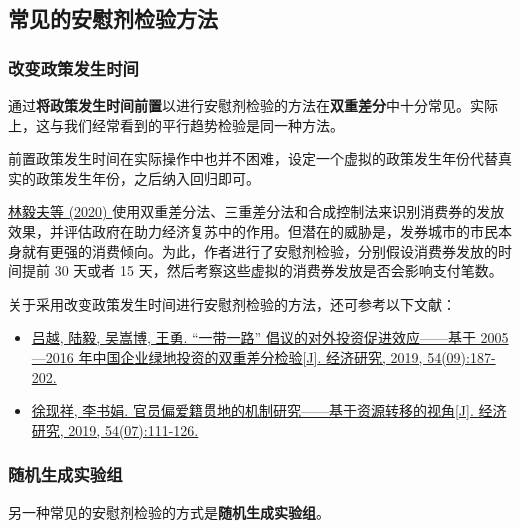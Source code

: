 \documentclass[11pt,a4paper]{ctexart}
\begin{document}
\subsection{常见的安慰剂检验方法}

\subsubsection{改变政策发生时间}

通过\textbf{将政策发生时间前置}以进行安慰剂检验的方法在\textbf{双重差分}中十分常见。实际上，这与我们经常看到的平行趋势检验是同一种方法。

前置政策发生时间在实际操作中也并不困难，设定一个虚拟的政策发生年份代替真实的政策发生年份，之后纳入回归即可。

\href{https://kns.cnki.net/kcms/detail/detail.aspx?dbcode=CJFD&dbname=CJFDLAST2020&filename=JJYJ202007003&v=x7X5dmdiedOaa8bSxA\%25mmd2ByjPeALwS0eTV4quCiAhRXzPQwX9Pz\%25mmd2B0XvIPOVK7gWj9Hd}{林毅夫等
(2020)
}使用双重差分法、三重差分法和合成控制法来识别消费券的发放效果，并评估政府在助力经济复苏中的作用。但潜在的威胁是，发券城市的市民本身就有更强的消费倾向。为此，作者进行了安慰剂检验，分别假设消费券发放的时间提前
30 天或者 15 天，然后考察这些虚拟的消费券发放是否会影响支付笔数。

关于采用改变政策发生时间进行安慰剂检验的方法，还可参考以下文献：

\begin{itemize}
\item
  \href{https://kns.cnki.net/kcms/detail/detail.aspx?dbcode=CJFD&dbname=CJFDLAST2019&filename=JJYJ201909013&v=ffsbFCXZ\%mmd2BXHwOmEIVrbSS8lJCYzScaY7P3QyYjJSIyIwlScqQ0M\%mmd2F8PFvLS81zuF6}{吕越,
  陆毅, 吴嵩博, 王勇. ``一带一路'' 倡议的对外投资促进效应------基于
  2005---2016 年中国企业绿地投资的双重差分检验{[}J{]}. 经济研究, 2019,
  54(09):187-202.}
\item
  \href{https://kns.cnki.net/kcms/detail/detail.aspx?dbcode=CJFD&dbname=CJFDLAST2019&filename=JJYJ201907009&v=ffsbFCXZ\%mmd2BXGD6x1UOIfO30hXEQv6NFQrmBKZpCCkzXGUx\%mmd2Bd0DCqfgc6\%mmd2BlOvejGQq}{徐现祥,
  李书娟. 官员偏爱籍贯地的机制研究------基于资源转移的视角{[}J{]}.
  经济研究, 2019, 54(07):111-126.}
\end{itemize}

\subsubsection{随机生成实验组}

另一种常见的安慰剂检验的方式是\textbf{随机生成实验组}。
\end{document}
